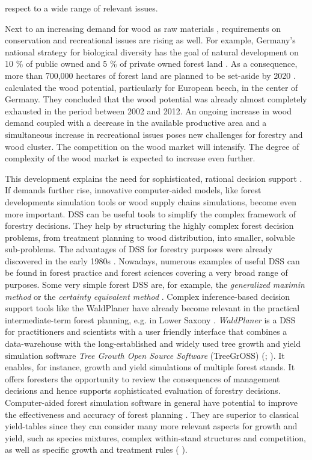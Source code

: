 respect to a wide range of relevant issues.

Next to an increasing demand for wood as raw materials \citep[p. 8]{mantau_2012}, requirements on conservation and recreational issues are rising as well. For example, Germany's national strategy for biological diversity has the goal of natural development on 10 \% of public owned and 5 \% of private owned forest land \citep[p. 45]{bmu_2007}. As a consequence, more than 700,000 hectares of forest land are planned to be set-aside by 2020 \citep{ti_2014}. \citet[p. 3]{auer_2016} calculated the wood potential, particularly for European beech, in the center of Germany. They concluded that the wood potential was already almost completely exhausted in the period between 2002 and 2012. An ongoing increase in wood demand coupled with a decrease in the available productive area and a simultaneous increase in recreational issues \citep[p. 1]{hansen_2012} poses new challenges for forestry and wood cluster. The competition on the wood market will intensify. The degree of complexity of the wood market is expected to increase even further.

This development explains the need for sophisticated, rational decision support \citep[p. 2]{hansen_2014}. If demands further rise, innovative computer-aided models, like forest developments simulation tools or wood supply chains simulations, become even more important. DSS can be useful tools to simplify the complex framework of forestry decisions. They help by structuring the highly complex forest decision problems, from treatment planning to wood distribution, into smaller, solvable sub-problems. The advantages of DSS for forestry purposes were already discovered in the early 1980s \citep[p. 499]{reynolds_2008}. Nowadays, numerous examples of useful DSS can be found in forest practice and forest sciences covering a very broad range of purposes. Some very simple forest DSS are, for example, the \textit{generalized maximin method} or the \textit{certainty equivalent method} \citep[p. 25, 28]{kangas_2015}. Complex inference-based decision support tools like the WaldPlaner \citep{hansen_2014} have already become relevant in the practical intermediate-term forest planning, e.g. in Lower Saxony \citep[p. 158]{bockmann_2004}. \textit{WaldPlaner} is a DSS for practitioners and scientists with a user friendly interface that combines a data-warehouse with the long-established and widely used tree growth and yield simulation software \textit{Tree Growth Open Source Software} (TreeGrOSS) (\citealp[p. 46]{hansen_2014}; \citealp{nagel_2009}). It enables, for instance, growth and yield simulations of multiple forest stands. It offers foresters the opportunity to review the consequences of management decisions and hence supports sophisticated evaluation of forestry decisions. Computer-aided forest simulation software in general have potential to improve the effectiveness and accuracy of forest planning \citep[p. 210]{davis_2001}. They are superior to classical yield-tables since they can consider many more relevant aspects for growth and yield, such as species mixtures, complex within-stand structures and competition, as well as specific growth and treatment rules (\citealp[p. 3]{hansen_2012} \citealp[p. 93]{muys_2010}).

